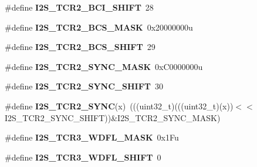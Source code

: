 \begin{DoxyCompactItemize}
\item 
\#define {\bfseries I2\+S\+\_\+\+T\+C\+R2\+\_\+\+B\+C\+I\+\_\+\+S\+H\+I\+FT}~28\hypertarget{group__I2S__Register__Masks_gaa9612abbad00a02a4d3dc1a7dfe6463d}{}\label{group__I2S__Register__Masks_gaa9612abbad00a02a4d3dc1a7dfe6463d}

\item 
\#define {\bfseries I2\+S\+\_\+\+T\+C\+R2\+\_\+\+B\+C\+S\+\_\+\+M\+A\+SK}~0x20000000u\hypertarget{group__I2S__Register__Masks_ga8969a374d290181e8f2c7a1c5ff4f31b}{}\label{group__I2S__Register__Masks_ga8969a374d290181e8f2c7a1c5ff4f31b}

\item 
\#define {\bfseries I2\+S\+\_\+\+T\+C\+R2\+\_\+\+B\+C\+S\+\_\+\+S\+H\+I\+FT}~29\hypertarget{group__I2S__Register__Masks_ga4f9b5cf67219ec5115ced3b69bfda155}{}\label{group__I2S__Register__Masks_ga4f9b5cf67219ec5115ced3b69bfda155}

\item 
\#define {\bfseries I2\+S\+\_\+\+T\+C\+R2\+\_\+\+S\+Y\+N\+C\+\_\+\+M\+A\+SK}~0x\+C0000000u\hypertarget{group__I2S__Register__Masks_ga2626d37b42ede711d867e8f750fb2c2c}{}\label{group__I2S__Register__Masks_ga2626d37b42ede711d867e8f750fb2c2c}

\item 
\#define {\bfseries I2\+S\+\_\+\+T\+C\+R2\+\_\+\+S\+Y\+N\+C\+\_\+\+S\+H\+I\+FT}~30\hypertarget{group__I2S__Register__Masks_ga7817b4e017fd01d7ca9a59e87008656f}{}\label{group__I2S__Register__Masks_ga7817b4e017fd01d7ca9a59e87008656f}

\item 
\#define {\bfseries I2\+S\+\_\+\+T\+C\+R2\+\_\+\+S\+Y\+NC}(x)~(((uint32\+\_\+t)(((uint32\+\_\+t)(x))$<$$<$I2\+S\+\_\+\+T\+C\+R2\+\_\+\+S\+Y\+N\+C\+\_\+\+S\+H\+I\+FT))\&I2\+S\+\_\+\+T\+C\+R2\+\_\+\+S\+Y\+N\+C\+\_\+\+M\+A\+SK)\hypertarget{group__I2S__Register__Masks_gaf91c3899959e7f1cf7e0a464df66a8e2}{}\label{group__I2S__Register__Masks_gaf91c3899959e7f1cf7e0a464df66a8e2}

\item 
\#define {\bfseries I2\+S\+\_\+\+T\+C\+R3\+\_\+\+W\+D\+F\+L\+\_\+\+M\+A\+SK}~0x1\+Fu\hypertarget{group__I2S__Register__Masks_ga49de2df89ebdb02cdb32c8a15f9ac7b4}{}\label{group__I2S__Register__Masks_ga49de2df89ebdb02cdb32c8a15f9ac7b4}

\item 
\#define {\bfseries I2\+S\+\_\+\+T\+C\+R3\+\_\+\+W\+D\+F\+L\+\_\+\+S\+H\+I\+FT}~0\hypertarget{group__I2S__Register__Masks_ga984179c79c4fc833f32c031c69a33cd9}{}\label{group__I2S__Register__Masks_ga984179c79c4fc833f32c031c69a33cd9}


\end{DoxyCompactItemize}
